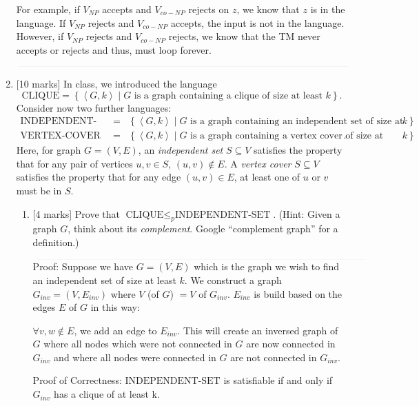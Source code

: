 \documentclass{article}
\newcommand{\class}[1]{\text{#1}}
\newcommand{\set}[1]{{\left\{#1\right\}}}    %
\newcommand{\enc}[1]{\left<#1\right>}
\begin{document}
\begin{enumerate}
            For example, if $V_{NP}$ accepts and $V_{co-NP}$ rejects on $z$, we know that $z$ is in the language. If $V_{NP}$ rejects and $V_{co-NP}$ accepts, the input is not in the language. However, if $V_{NP}$ rejects and $V_{co-NP}$ rejects, we know that the TM never accepts or rejects and thus, must loop forever.

            $\textcolor[RGB]{220,220,220}{\rule{\linewidth}{0.2pt}}$

    \item {[10 marks]} In class, we introduced the language
    \[
        \class{CLIQUE} = \set{\enc{G,k}\mid G\text{ is a graph containing a clique of size at least }k}.
    \]
    Consider now two further languages:
    \begin{eqnarray*}
        \class{INDEPENDENT-SET} &=& \set{\enc{G,k}\mid G\text{ is a graph containing an independent set of size at least }k}\\
        \class{VERTEX-COVER} &=& \set{\enc{G,k}\mid G\text{ is a graph containing a vertex cover of size at most }k}.
    \end{eqnarray*}
    Here, for graph $G=(V,E)$, an \emph{independent set} $S\subseteq V$ satisfies the property that for any pair of vertices $u,v\in S$, $(u,v)\not\in E$. A \emph{vertex cover} $S\subseteq V$ satisfies the property that for any edge $(u,v)\in E$, at least one of $u$ or $v$ must be in $S$.
    \begin{enumerate}
        \item {[4 marks]} Prove that $\class{CLIQUE}\leq_p\class{INDEPENDENT-SET}$. (Hint: Given a graph $G$, think about its \emph{complement}. Google ``complement graph'' for a definition.)

            $\textcolor[RGB]{220,220,220}{\rule{\linewidth}{0.2pt}}$
            Proof: Suppose we have $G = (V,E)$ which is the graph we wish to find an independent set of size at least $k$. We construct a graph $G_{inv} = (V,E_{inv})$ where $V$ (of $G$) $= V$ of $G_{inv}$. $E_{inv}$ is build based on the edges $E$ of $G$ in this way:

            $\forall v, w \not\in E$, we add an edge to $E_{inv}$. This will create an inversed graph of $G$ where all nodes which were not connected in $G$ are now connected in $G_{inv}$ and where all nodes were connected in $G$ are not connected in $G_{inv}$.

            Proof of Correctness: $\class{INDEPENDENT-SET}$ is satisfiable if and only if $G_{inv}$ has a clique of at least k.


\end{enumerate}
\end{enumerate}
\end{document}
